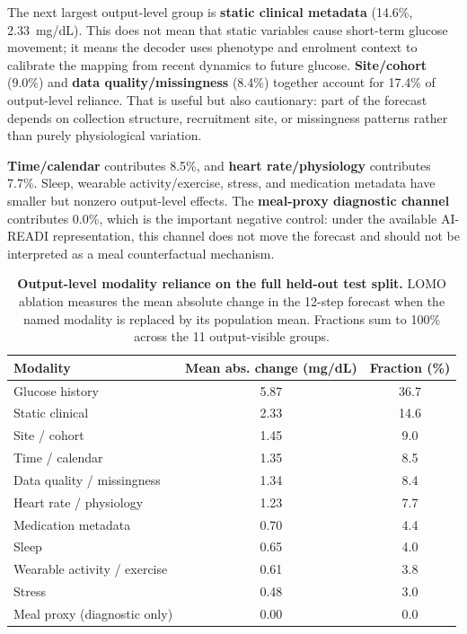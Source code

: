 The next largest output-level group is \textbf{static clinical metadata}
(14.6\%, 2.33~mg/dL).
This does not mean that static variables cause short-term glucose movement;
it means the decoder uses phenotype and enrolment context to calibrate the
mapping from recent dynamics to future glucose.
\textbf{Site/cohort} (9.0\%) and \textbf{data quality/missingness} (8.4\%)
together account for 17.4\% of output-level reliance.
That is useful but also cautionary: part of the forecast depends on collection
structure, recruitment site, or missingness patterns rather than purely
physiological variation.

\textbf{Time/calendar} contributes 8.5\%, and \textbf{heart rate/physiology}
contributes 7.7\%.
Sleep, wearable activity/exercise, stress, and medication metadata have smaller
but nonzero output-level effects.
The \textbf{meal-proxy diagnostic channel} contributes 0.0\%, which is the
important negative control: under the available AI-READI representation, this
channel does not move the forecast and should not be interpreted as a meal
counterfactual mechanism.

\begin{table}[H]
  \centering
  \caption{%
    \textbf{Output-level modality reliance on the full held-out test split.}
    LOMO ablation measures the mean absolute change in the 12-step forecast
    when the named modality is replaced by its population mean.
    Fractions sum to 100\% across the 11 output-visible groups. %
  }
  \label{tab:interp_lomo_full}
  \small
  \begin{tabular}{lcc}
    \toprule
    Modality & Mean abs. change (mg/dL) & Fraction (\%) \\
    \midrule
    Glucose history               & 5.87 & 36.7 \\
    Static clinical               & 2.33 & 14.6 \\
    Site / cohort                 & 1.45 &  9.0 \\
    Time / calendar               & 1.35 &  8.5 \\
    Data quality / missingness    & 1.34 &  8.4 \\
    Heart rate / physiology       & 1.23 &  7.7 \\
    Medication metadata           & 0.70 &  4.4 \\
    Sleep                         & 0.65 &  4.0 \\
    Wearable activity / exercise  & 0.61 &  3.8 \\
    Stress                        & 0.48 &  3.0 \\
    Meal proxy (diagnostic only)  & 0.00 &  0.0 \\
    \bottomrule
  \end{tabular}
\end{table}

